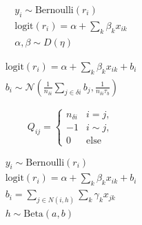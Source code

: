 \documentclass{scrartcl}
\begin{document}
\begin{gather*}
  y_i \sim \text{Bernoulli}(r_i) \\
  \text{logit}(r_i) = \alpha + \sum_k \beta_k x_{ik} \\
  \alpha, \beta \sim D(\eta)
\end{gather*}

\begin{gather*}
  \text{logit}(r_i) = \alpha + \sum_k \beta_k x_{ik} + b_i\\
  b_i \sim \mathcal{N}\left(\frac{1}{n_{\delta i}}\sum_{j\in\delta i}b_j, \frac{1}{n_{\delta i}\tau_b}\right)
\end{gather*}

\begin{equation*}
      Q_{ij} =
    \begin{cases}
      n_{\delta i} & i = j,\\
      -1 & i \sim j,\\
      0 & \text{else}
    \end{cases}
\end{equation*}

\begin{gather*}
  y_i \sim \text{Bernoulli}(r_i) \\
  \text{logit}(r_i) = \alpha + \sum_k \beta_k x_{ik} + b_i\\
  b_i = \sum_{j\in N(i, h)} \sum_k\gamma_k x_{jk}\\
  h \sim \text{Beta}(a, b)
\end{gather*}
\end{document}
